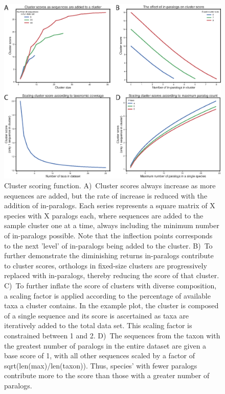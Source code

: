 \documentclass[twocolumn]{bmcart}  %
\begin{document}
\begin{figure}[t]
  \begin{center}
  \includegraphics[height=0.5\textheight]{../figures/orthogroup_scores.eps}
\end{center}
\caption{Cluster scoring function.
A)~Cluster scores always increase as more sequences are added, but the rate of increase is reduced with the addition of in-paralogs.
Each series represents a square matrix of X species with X paralogs each, where sequences are added to the sample cluster one at a time, always including the minimum number of in-paralogs possible.
Note that the inflection points corresponds to the next 'level' of in-paralogs being added to the cluster.
B)~To further demonstrate the diminishing returns in-paralogs contribute to cluster scores, orthologs in fixed-size clusters are progressively replaced with in-paralogs, thereby reducing the score of that cluster.
C)~To further inflate the score of clusters with diverse composition, a scaling factor is applied according to the percentage of available taxa a cluster contains.
In the example plot, the cluster is composed of a single sequence and its score is ascertained as taxa are iteratively added to the total data set.
This scaling factor is constrained between 1 and 2.
D)~The sequences from the taxon with the greatest number of paralogs in the entire dataset are given a base score of 1, with all other sequences scaled by a factor of sqrt(len(max)/len(taxon)).
Thus, species' with fewer paralogs contribute more to the score than those with a greater number of paralogs. }
\label{fig:orthogroupscores}
\end{figure}
\end{document}
